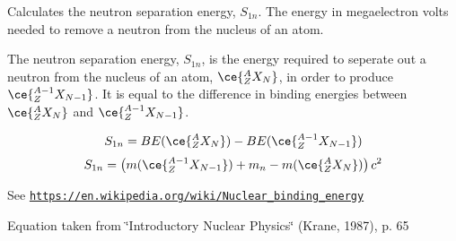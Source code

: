 Calculates the neutron separation energy, $S_{1n}$. The energy in megaelectron volts needed to remove a neutron from the nucleus of an atom. 

The neutron separation energy, $S_{1n}$, is the energy required to seperate out a neutron from the nucleus of an atom, $\ce{ ^{A}_{Z}X_{N} }$, in order to produce $\ce{ ^{A-1}_{Z}X_{N-1} }$. It is equal to the difference in binding energies between $\ce{ ^{A}_{Z}X_{N} }$ and $\ce{ ^{A-1}_{Z}X_{N-1} }$.

\[S_{1n} = BE(\ce{ ^{A}_{Z}X_{N} }) - BE(\ce{ ^{A-1}_{Z}X_{N-1} })\] \[S_{1n} = \left ( m(\ce{ ^{A-1}_{Z}X_{N-1} }) + m_n - m(\ce{ ^{A}_{Z}X_{N} }) \right ) c^2\]

See \href{https://en.wikipedia.org/wiki/Nuclear_binding_energy}{\tt https\+://en.\+wikipedia.\+org/wiki/\+Nuclear\+\_\+binding\+\_\+energy}

Equation taken from \char`\"{}\+Introductory Nuclear Physics\char`\"{} (Krane, 1987), p. 65


